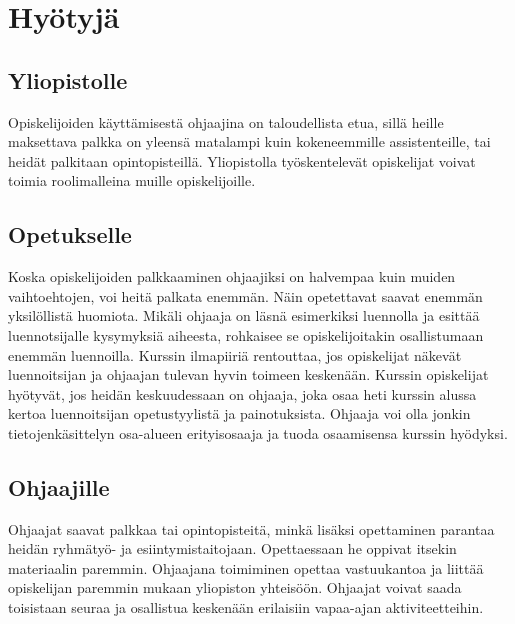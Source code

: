 \documentclass[finnish]{tktltiki2}
\theoremstyle{definition}
\theoremstyle{remark}
\begin{document}
\section{Hyötyjä}

\subsection{Yliopistolle}
Opiskelijoiden käyttämisestä ohjaajina on taloudellista etua, sillä heille maksettava palkka on yleensä matalampi kuin kokeneemmille assistenteille, tai heidät palkitaan opintopisteillä. Yliopistolla työskentelevät opiskelijat voivat toimia roolimalleina muille opiskelijoille.\cite{Tashakkori05}

\subsection{Opetukselle}
Koska opiskelijoiden palkkaaminen ohjaajiksi on halvempaa kuin muiden vaihtoehtojen, voi heitä palkata enemmän. Näin opetettavat saavat enemmän yksilöllistä huomiota. Mikäli ohjaaja on läsnä esimerkiksi luennolla ja esittää luennotsijalle kysymyksiä aiheesta, rohkaisee se opiskelijoitakin osallistumaan enemmän luennoilla. Kurssin ilmapiiriä rentouttaa, jos opiskelijat näkevät luennoitsijan ja ohjaajan tulevan hyvin toimeen keskenään. Kurssin opiskelijat hyötyvät, jos heidän keskuudessaan on ohjaaja, joka osaa heti kurssin alussa kertoa luennoitsijan opetustyylistä ja painotuksista. Ohjaaja voi olla jonkin tietojenkäsittelyn osa-alueen erityisosaaja ja tuoda osaamisensa kurssin hyödyksi.\cite{Dickson11}

\subsection{Ohjaajille}
Ohjaajat saavat palkkaa tai opintopisteitä, minkä lisäksi opettaminen parantaa heidän ryhmätyö- ja esiintymistaitojaan. Opettaessaan he oppivat itsekin materiaalin paremmin.\cite{Reges03} Ohjaajana toimiminen opettaa vastuukantoa ja liittää opiskelijan paremmin mukaan yliopiston yhteisöön.\cite{Dickson11} Ohjaajat voivat saada toisistaan seuraa ja osallistua keskenään erilaisiin vapaa-ajan aktiviteetteihin.\cite{Roberts95}


\end{document}
